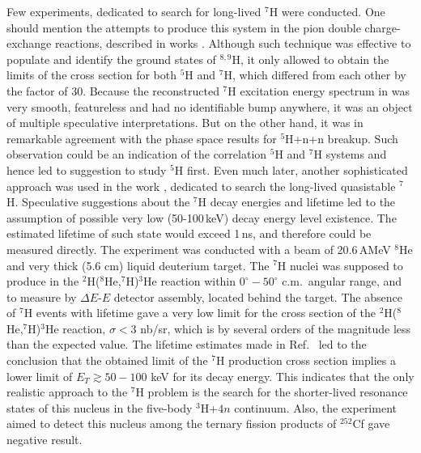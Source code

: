 Few experiments, dedicated to search for long-lived $^{7}$H were conducted.
One should mention the attempts to produce this system in the pion double charge-exchange reactions, described in works \cite{Seth:1981,Evseev:1981}.
Although such technique was effective to populate and identify the ground states of $^{8,9}$H, it only allowed to obtain the limits of the cross section for both $^{5}$H and $^{7}$H, which differed from each other by the factor of 30.
Because the reconstructed $^{7}$H excitation energy spectrum in \cite{Seth:1981} was very smooth, featureless and had no identifiable bump anywhere, it was an object of multiple speculative interpretations.
But on the other hand, it was in remarkable agreement with the phase space results for $^{5}$H+n+n breakup.
Such observation could be an indication of the correlation $^{5}$H and $^{7}$H systems and hence led to suggestion to study $^{5}$H first.
Even much later, another sophisticated approach was used in the work \cite{Golovkov:2004}, dedicated to search the long-lived quasistable $^{7}$H.
Speculative suggestions about the $^{7}$H decay energies and lifetime led to the assumption of possible very low (50-100\,keV) decay energy level existence.
The estimated lifetime of such state would exceed 1\,ns, and therefore could be measured directly.
The experiment was conducted with a beam of 20.6\,AMeV $^{8}$He and very thick (5.6 cm) liquid deuterium target.
The $^{7}$H nuclei was supposed to produce in the $^2$H($^8$He,$^7$H)$^3$He reaction within $0^{\circ}-50^{\circ}$ c.m.\ angular range, and to measure by $\Delta E$-$E$ detector assembly, located behind the target. 
The absence of $^7$H events with lifetime gave a very low limit for the cross section of the $^2$H($^8$He,$^7$H)$^3$He reaction, $\sigma < 3$ nb/sr, which is by several orders of the magnitude less than the expected value.
The lifetime estimates made in Ref.\ \cite{Golovkov:2004} led to the conclusion that the obtained limit of the $^{7}$H production cross section implies a lower limit of $E_T \gtrsim 50-100$ keV for its decay energy.
This indicates that the only realistic approach to the $^7$H problem is the search for the shorter-lived resonance states of this nucleus in the five-body $^{3}$H+$4n$ continuum.
Also, the experiment \cite{Aleksandrov:1982} aimed to detect this nucleus among the ternary fission products of $^{252}$Cf gave negative result.

